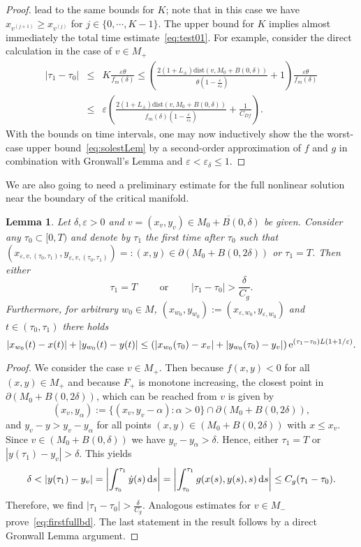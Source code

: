 \documentclass[12pt]{article}
\newtheorem{lem}[thm]{Lemma}
\def\txtd{{\textnormal{d}}}
\def\txte{{\textnormal{e}}}
\newcommand{\be}{\begin{equation}}
\newcommand{\ee}{\end{equation}}
\newcommand{\beann}{\begin{eqnarray*}}
\newcommand{\eeann}{\end{eqnarray*}}
\newcommand{\benn}{\begin{equation*}}
\newcommand{\eenn}{\end{equation*}}
\begin{document}
\begin{proof}
lead to the same bounds for $K$; note that in this case we have 
$x_{v^{(j+1)}} \geq x_{v^{(j)}}$ for $j\in \{0,\cdots, K-1\}$. 
The upper bound for $K$ implies almost immediately 
the total time estimate~\eqref{eq:test01}. For example, consider the 
direct calculation in the case of $v\in M_+$ 
\beann
|\tau_1-\tau_0| &\leq& K\frac{\varepsilon\theta}{f_m(\delta)} 
\leq \left(\frac{2(1+L_\pm)\mathrm{dist}(v, M_0+B(0,\delta))}{\theta
\left(1-\frac{\varepsilon}{\varepsilon_\delta}\right)} + 1\right) 
\frac{\varepsilon\theta}{f_m(\delta)}\\
&\leq& \varepsilon \left( \frac{2(1+L_\pm)\mathrm{dist}(v, M_0+B(0,
\delta))}{f_m(\delta)\left(1-\frac{\varepsilon}{\varepsilon_\delta}\right)}
+ \frac{1}{C_{Df}}\right).
\eeann
With the bounds on time intervals, one may now inductively show the 
the worst-case upper bound~\eqref{eq:solestLem} by a second-order 
approximation of $f$ and $g$ in combination with Gronwall's Lemma and 
$\varepsilon<\varepsilon_\delta\leq 1$. 	
\end{proof}

We are also going to need a preliminary estimate for the full nonlinear
solution near the boundary of the critical manifold.

\begin{lem}
\label{Lem:estim_time_exact_sol}
Let $\delta,\varepsilon>0$ and $v=(x_v,y_v)\in \overline{M_0+B(0,\delta)}$ be given.
Consider any $\tau_0\subset [0,T)$ and denote by $\tau_1$ the first time 
after $\tau_0$ such that 
$(x_{\varepsilon,v,(\tau_0,\tau_1)},y_{\varepsilon,v,(\tau_0,\tau_1)})=:(x,y)\in 
\partial(M_0+B(0,2\delta))$ or $\tau_1=T$.
Then either 
\be
\label{eq:firstfullbd}
\tau_1=T \qquad \text{ or }\qquad |\tau_1-\tau_0|>\frac{\delta}{C_g}.
\ee
Furthermore, for arbitrary $w_0\in M$, $(x_{w_0},y_{w_0}):=(x_{\varepsilon,w_0},
y_{\varepsilon,w_0})$ and $t\in (\tau_0,\tau_1)$ there 
holds
\benn
| x_{w_0}(t) - x(t)|+ | y_{w_0}(t) - y(t)|\leq\left(|x_{w_0}(\tau_0)-x_v|
+ | y_{w_0}(\tau_0) - y_v|\right)
	 \txte^{ (\tau_1-\tau_0)L \left(1+1/\varepsilon\right)}.
\eenn
\end{lem}

\begin{proof}
We consider the case 
$v\in M_+$. Then because $f(x,y)<0$ for all $(x,y)\in M_+$ and because 
$F_+$ is monotone increasing, the closest point in $\partial(M_0+B(0,2\delta))$, 
which can be reached from $v$ is given by 
\benn
(x_v,y_\alpha):=\{(x_v,y_v-\alpha): \alpha >0\}\cap 
\partial(M_0+B(0,2\delta)),
\eenn
and $y_v - y > y_v - y_\alpha$ for all points $(x,y) \in (M_0 + B(0,2\delta))$ 
with $x \leq x_v$. 
Since $v\in (M_0+B(0,\delta))$ we have $y_v-y_\alpha> \delta$. Hence, 
either $\tau_1=T$ or $|y(\tau_1)-y_v| >\delta$. This yields
\benn
\delta< |y(\tau_1)-y_v |= 
\left|\int_{\tau_0}^{\tau_1} \dot{y}(s)\, \txtd s\right| 
= \left|\int_{\tau_0}^{\tau_1} g(x(s),y(s),s)\, \txtd s \right|\leq C_g 
(\tau_1-\tau_0).
\eenn 
Therefore, we find $|\tau_1-\tau_0|>\frac{\delta}{C_g}$. Analogous estimates 
for $v\in M_-$ prove~\eqref{eq:firstfullbd}. The last statement in the result
follows by a direct Gronwall Lemma argument.
\end{proof}
\end{document}
